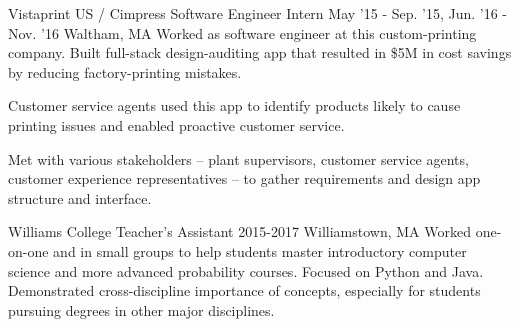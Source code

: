 \begin{cventries}
\cventry
{Vistaprint US / Cimpress} %
{Software Engineer Intern} %
{May '15 - Sep. '15, Jun. '16 - Nov. '16} %
{Waltham, MA} %
{Worked as software engineer at this custom-printing company. Built full-stack
design-auditing app that resulted in \$5M in cost savings by reducing
factory-printing mistakes.}
{\begin{cvitems} %
\item Customer service agents used this app to identify products likely to
cause printing issues and enabled proactive customer service.
\item Met with various stakeholders – plant supervisors, customer service
agents, customer experience representatives – to gather requirements and design
app structure and interface.
\end{cvitems}}

\cventry
{Williams College}
{Teacher's Assistant}
{2015-2017}
{Williamstown, MA}
{Worked one-on-one and in small groups to help students master introductory
computer science and more advanced probability courses. Focused on Python and
Java. Demonstrated cross-discipline importance of concepts, especially for
students pursuing degrees in other major disciplines.}
{}

\end{cventries}
